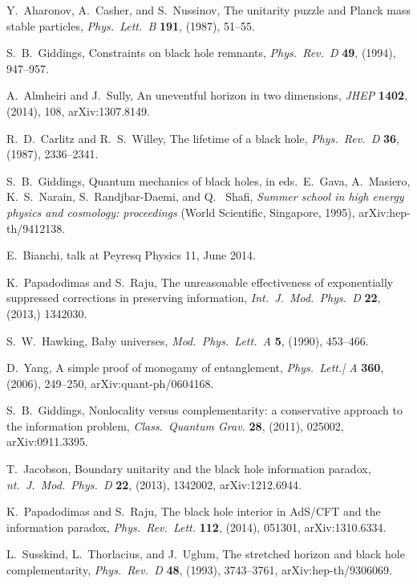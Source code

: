 \documentclass[11pt]{article}
\begin{document}
\begin{thebibliography}{999}
 Y.\ Aharonov, A.\ Casher, and S.\ Nussinov,
The unitarity puzzle and Planck mass stable particles,
\emph{Phys.\ Lett.\ B} {\bf 191}, (1987), 51--55.

 S.~B.\ Giddings, Constraints on black hole 
remnants, \emph{Phys.\ Rev.\ D} {\bf 49}, (1994), 947--957.

 A.\ Almheiri and J.\ Sully, An uneventful 
horizon in two dimensions, \emph{JHEP} {\bf 1402}, (2014),
108, arXiv:1307.8149.

 R.~D.\ Carlitz and R.~S.\ Willey, The
lifetime of a black hole, \emph{Phys.\ Rev.\ D} {\bf 36},
(1987), 2336--2341.

 S.~B.\ Giddings, Quantum mechanics of 
black holes, in eds.\  E.\ Gava, A.\ Masiero, K.~S.\ Narain, 
S.\ Randjbar-Daemi, and Q. \ Shafi, \emph{Summer school in
high energy physics and cosmology: proceedings} (World
Scientific, Singapore, 1995), arXiv:hep-th/9412138.

 E.\ Bianchi, talk at Peyresq Physics 11, 
June 2014.

 K.\ Papadodimas and S.\ Raju,
The unreasonable effectiveness of exponentially suppressed 
corrections in preserving information, \emph{Int.\ J.\ Mod.\ Phys.\ D}
{\bf 22},  (2013,) 1342030.

 S.~W.\ Hawking, Baby universes, 
\emph{Mod.\ Phys.\ Lett.\ A} {\bf 5}, (1990), 453--466.

 D.\ Yang, A simple proof of monogamy of
entanglement, \emph{Phys.\ Lett.| A} {\bf 360}, (2006), 249--250,
arXiv:quant-ph/0604168.

 S.~B.\ Giddings, Nonlocality versus complementarity: 
a conservative approach to the information problem, \emph{Class.\
Quantum Grav.} {\bf 28}, (2011), 025002, arXiv:0911.3395.

 T.\ Jacobson, Boundary unitarity and the black 
hole information paradox, \emph{nt.\ J.\ Mod.\ Phys.\ D} {\bf 22}, 
(2013), 1342002, arXiv:1212.6944.

  K.\ Papadodimas and S.\ Raju,
The black hole interior in AdS/CFT and the information paradox,
\emph{Phys.\ Rev.\ Lett.} {\bf 112}, (2014), 051301,
arXiv:1310.6334.

 L.\ Susskind, L.\ Thorlacius, and J.\ Uglum,
The stretched horizon and black hole complementarity,
\emph{Phys.\ Rev.\ D} {\bf 48}, (1993), 3743--3761,
arXiv:hep-th/9306069.


\end{thebibliography}
\end{document}
